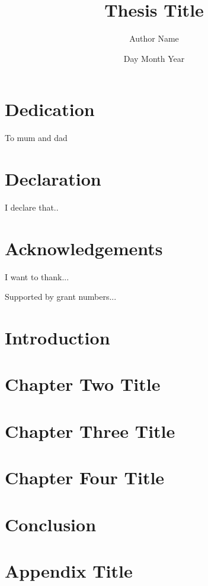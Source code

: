\documentclass[11pt]{report}
\title{Thesis Title}
\author{Author Name}
\date{Day Month Year}
\begin{document}


    

    \chapter*{Dedication}

    To mum and dad

    \chapter*{Declaration}

    I declare that..

    \chapter*{Acknowledgements}

    I want to thank...

    Supported by grant numbers...

    \tableofcontents


    \listoffigures


    \listoftables


    \chapter{Introduction}

    \chapter{Chapter Two Title}

    \chapter{Chapter Three Title}

    \chapter{Chapter Four Title}

    \chapter{Conclusion}

    \appendix
    \chapter{Appendix Title}

    \printbibliography
\end{document}
